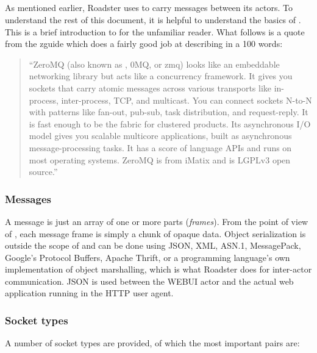 \subsection{\zmq}\label{sec:scope:zmq}
As mentioned earlier, Roadster uses \zmq to carry messages between its actors.
To understand the rest of this document, it is
helpful to understand the basics of \zmq. This is a brief introduction to
\zmq for the unfamiliar reader. What follows is a quote from the \gls{zguide}
which does a fairly good job at describing \zmq in a 100 words:

\begin{quote}
``ZeroMQ (also known as \zmq, 0MQ, or zmq) looks like an embeddable networking
library but acts like a concurrency framework. It gives you sockets that carry
atomic messages across various transports like in-process, inter-process, TCP,
and multicast. You can connect sockets N-to-N with patterns like fan-out,
pub-sub, task distribution, and request-reply. It is fast enough to be the
fabric for clustered products. Its asynchronous I/O model gives you scalable
multicore applications, built as asynchronous message-processing tasks. It has
a score of language APIs and runs on most operating systems.  ZeroMQ is from
iMatix and is LGPLv3 open source.''
\end{quote}

\subsubsection{Messages}
A message is just an array of one or more parts (\emph{frames}). From the point
of view of \zmq, each message frame is simply a
chunk of opaque data. Object serialization is outside the scope of \zmq and can be done using
JSON, XML, ASN.1, MessagePack, Google's Protocol Buffers, Apache Thrift, or a
programming language's own implementation of object marshalling, which is what
Roadster does for inter-actor communication. JSON is used between the WEBUI
actor and the actual web application running in the HTTP user agent.

\subsubsection{Socket types}
A number of socket types are provided, of which the most important pairs are:

